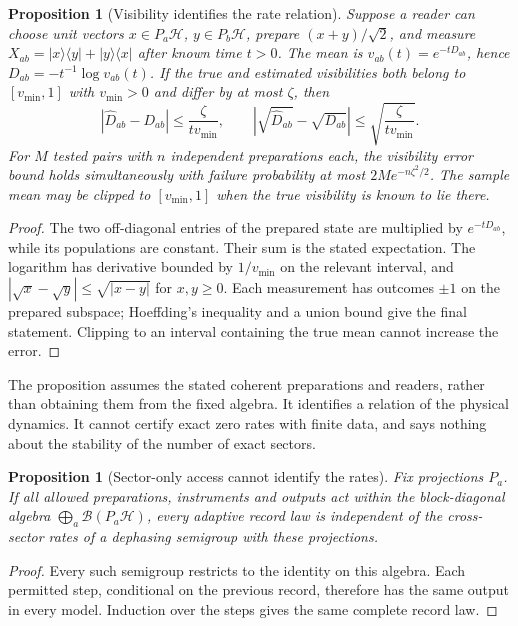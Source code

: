 \documentclass[12pt,a4paper]{article}
\newtheorem{proposition}[theorem]{Proposition}
\begin{document}
\begin{proposition}[Visibility identifies the rate relation]
\label{prop:rate-identification}
Suppose a reader can choose unit vectors $x\in P_a\mathcal H$,
$y\in P_b\mathcal H$, prepare $(x+y)/\sqrt2$, and measure
$X_{ab}=|x\rangle\langle y|+|y\rangle\langle x|$ after known time
$t>0$. The mean is $v_{ab}(t)=e^{-tD_{ab}}$, hence
$D_{ab}=-t^{-1}\log v_{ab}(t)$.
If the true and estimated visibilities both belong to
$[v_{\min},1]$ with $v_{\min}>0$ and differ by at most $\zeta$, then
\[
 |\widehat D_{ab}-D_{ab}|\le\frac{\zeta}{tv_{\min}},\qquad
 |\sqrt{\widehat D_{ab}}-\sqrt{D_{ab}}|
 \le\sqrt{\frac{\zeta}{tv_{\min}}}.
\]
For $M$ tested pairs with $n$ independent preparations each, the
visibility error bound holds simultaneously with failure probability
at most $2M e^{-n\zeta^2/2}$. The sample mean may be clipped to
$[v_{\min},1]$ when the true visibility is known to lie there.
\end{proposition}

\begin{proof}
The two off-diagonal entries of the prepared state are multiplied
by $e^{-tD_{ab}}$, while its populations are constant. Their sum is
the stated expectation. The logarithm has derivative bounded by
$1/v_{\min}$ on the relevant interval, and
$|\sqrt{x}-\sqrt{y}|\le\sqrt{|x-y|}$ for $x,y\ge0$.
Each measurement has outcomes $\pm1$ on the prepared subspace;
Hoeffding's inequality and a union bound give the final statement.
Clipping to an interval containing the true mean cannot increase
the error.
\end{proof}

The proposition assumes the stated coherent preparations and
readers, rather than obtaining them from the fixed algebra.
It identifies a relation of the physical dynamics. It cannot
certify exact zero rates with finite data, and says nothing about
the stability of the number of exact sectors.

\begin{proposition}[Sector-only access cannot identify the rates]
\label{prop:sector-blindness}
Fix projections $P_a$. If all allowed preparations, instruments and
outputs act within the block-diagonal algebra
$\bigoplus_a\mathcal B(P_a\mathcal H)$, every adaptive record law is
independent of the cross-sector rates of a dephasing semigroup
with these projections.
\end{proposition}
\begin{proof}
Every such semigroup restricts to the identity on this algebra.
Each permitted step, conditional on the previous record, therefore
has the same output in every model. Induction over the steps gives
the same complete record law.
\end{proof}
\end{document}
